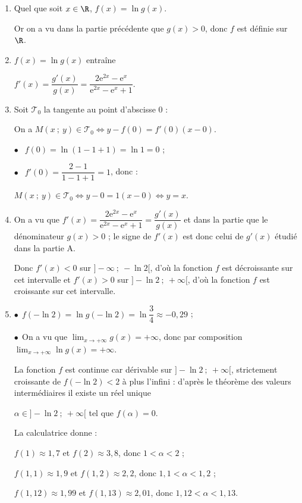 \begin{enumerate}
\item %

Quel que soit $x \in \R$, \: $f(x) = \ln g(x)$.

Or on a vu dans la partie précédente que $g(x) > 0$, donc $f$ est définie sur $\R$.
\item %

$f(x) = \ln g(x)$ entraîne 

$f'(x) = \dfrac{g'(x)}{g(x)} = \dfrac{2\text{e}^{2x} - \text{e}^x}{\text{e}^{2x} - \text{e}^x + 1}$.
\item %
Soit $\mathcal{T}_0$ la tangente au point d'abscisse $0$ :

On a $M(x~;~y) \in \mathcal{T}_0 \iff y - f(0) = f'(0)(x - 0)$.

$\bullet ~~$ $f(0) = \ln(1 - 1 + 1) = \ln 1 = 0$ ;

$\bullet ~~$ $f'(0) = \dfrac{2 - 1}{1 - 1 + 1} = 1$, donc :

$M(x~;~y) \in \mathcal{T}_0 \iff y - 0 = 1(x - 0) \iff y = x$.
\item %
On a vu que $f'(x) = \dfrac{2\text{e}^{2x} - \text{e}^x}{\text{e}^{2x} - \text{e}^x + 1} = \dfrac{g'(x)}{g(x)}$ et dans la partie que le dénominateur $g(x) > 0$ ; le signe de $f'(x)$ est donc celui de $g'(x)$ étudié dans la partie A.

Donc $f'(x) < 0$ sur $]- \infty~;~- \ln 2[$, d'où la fonction $f$ est décroissante sur cet intervalle et $f'(x) > 0$ sur $]- \ln 2~;~+ \infty[$, d'où la fonction $f$ est croissante sur cet intervalle.
\item %
$\bullet~~$$f(-\ln 2) = \ln g(- \ln 2) =\ln \dfrac34 \approx- 0,29$ ;

$\bullet~~$On a vu que $\displaystyle\lim_{x \to + \infty} g(x) = + \infty$, donc par composition 
$\displaystyle\lim_{x \to + \infty} \ln g(x) = + \infty$.

La fonction $f$ est continue car dérivable sur $]- \ln 2~;~+ \infty[$, strictement croissante de $f(- \ln 2) < 2$ à plus l'infini : d'après le théorème des valeurs intermédiaires il existe un réel unique 

$\alpha \in ]- \ln 2~;~+ \infty[$ tel que $f(\alpha) = 0$.

La calculatrice donne :

$f(1) \approx 1,7$ et $f(2) \approx 3,8$, donc $1 < \alpha < 2$ ;

$f(1,1) \approx 1,9$ et $f(1,2) \approx 2,2$, donc $1,1 < \alpha < 1,2$ ;

$f(1,12) \approx 1,99$ et $f(1,13) \approx 2,01$, donc $1,12 < \alpha < 1,13$.
\end{enumerate}

